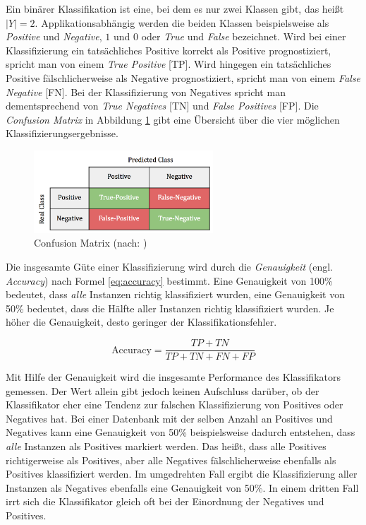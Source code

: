 Ein binärer Klassifikation ist eine, bei dem es nur zwei Klassen gibt, das heißt $|Y| = 2$. Applikationsabhängig werden die beiden Klassen beispielsweise als \emph{Positive} und \emph{Negative}, $1$ und $0$ oder \emph{True} und \emph{False} bezeichnet. Wird bei einer Klassifizierung ein tatsächliches Positive korrekt als Positive prognostiziert, spricht man von einem \emph{True Positive} [TP]. Wird hingegen ein tatsächliches Positive fälschlicherweise als Negative prognostiziert, spricht man von einem \emph{False Negative} [FN]. Bei der Klassifizierung von Negatives spricht man dementsprechend von \emph{True Negatives} [TN] und \emph{False Positives} [FP]. Die \emph{Confusion Matrix} in Abbildung \ref{img:Confusion-Matrix} gibt eine Übersicht über die vier möglichen Klassifizierungsergebnisse. \cite[S. 213 - 214]{machine_kubat}

\begin{figure}[h]
	\centering
	\includegraphics[width=0.6\textwidth]{bilder/Confusion-Matrix02.png}
	\caption[Confusion Matrix]{Confusion Matrix (nach: \cite[S. 214]{machine_kubat})}
	\label{img:Confusion-Matrix}
\end{figure}

Die insgesamte Güte einer Klassifizierung wird durch die \emph{Genauigkeit} (engl. \emph{Accuracy}) nach Formel \ref{eq:accuracy} bestimmt. Eine Genauigkeit von 100\% bedeutet, dass \emph{alle} Instanzen richtig klassifiziert wurden, eine Genauigkeit von 50\% bedeutet, dass die Hälfte aller Instanzen richtig klassifiziert wurden. Je höher die Genauigkeit, desto geringer der Klassifikationsfehler. \cite[S. 214]{machine_kubat}

\begin{equation}
\text{Accuracy} = \frac{TP+TN}{TP+TN+FN+FP}
\label{eq:accuracy}
\end{equation}

Mit Hilfe der Genauigkeit wird die insgesamte Performance des Klassifikators gemessen. Der Wert allein gibt jedoch keinen Aufschluss darüber, ob der Klassifikator eher eine Tendenz zur falschen Klassifizierung von Positives oder Negatives hat. Bei einer Datenbank mit der selben Anzahl an Positives und Negatives kann eine Genauigkeit von 50\% beispielsweise dadurch entstehen, dass \emph{alle} Instanzen als Positives markiert werden. Das heißt, dass alle Positives richtigerweise als Positives, aber alle Negatives fälschlicherweise ebenfalls als Positives klassifiziert werden. Im umgedrehten Fall ergibt die Klassifizierung aller Instanzen als Negatives ebenfalls eine Genauigkeit von 50\%. In einem dritten Fall irrt sich die Klassifikator gleich oft bei der Einordnung der Negatives und Positives. 

